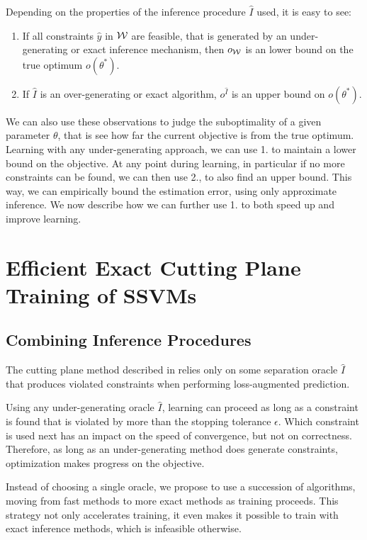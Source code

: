 Depending on the properties of the inference procedure $\hat{I}$ used, it is easy to see:
\begin{enumerate}
    \item If all constraints $\hat{y}$ in  $\mathcal{W}$ are feasible, that is generated
        by an under-generating or exact inference mechanism, then $o_{\mathcal{W}}$ is
        an lower bound on the true optimum $o(\theta^*)$.

    \item If $\hat{I}$ is an over-generating or exact algorithm, $o^{\hat{I}}$ is an upper
        bound on $o(\theta^*)$.
\end{enumerate}

We can also use these observations to judge the suboptimality of a given
parameter $\theta$, that is see how far the current objective is from the true
optimum.  Learning with any under-generating approach, we can use 1. to
maintain a lower bound on the objective. At any point during learning, in
particular if no more constraints can be found, we can then use 2., to also
find an upper bound.  This way, we can empirically bound the estimation error,
using only approximate inference.  We now describe how we can further use 1. to
both speed up and improve learning.


\section{Efficient Exact Cutting Plane Training of SSVMs}

\subsection{Combining Inference Procedures}
The cutting plane method described in  relies only
on some separation oracle $\hat{I}$ that produces violated constraints when
performing loss-augmented prediction.

Using any under-generating oracle $\hat{I}$, learning can proceed as long as a
constraint is found that is violated by more than the stopping tolerance
$\epsilon$.  Which constraint is used next has an impact on the speed of
convergence, but not on correctness. Therefore, as long as an under-generating
method does generate constraints, optimization makes progress on the objective.

Instead of choosing a single oracle, we propose to use a succession of
algorithms, moving from fast methods to more exact methods as training
proceeds. This strategy not only accelerates training, it even makes it
possible to train with exact inference methods, which is infeasible otherwise.

